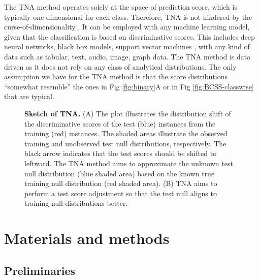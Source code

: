 \documentclass[10pt,letterpaper]{article}
\begin{document}
The TNA method operates solely at the space of prediction score, which is typically one dimensional for each class.
Therefore, TNA is not hindered by the curse-of-dimensionality \cite{donoho2000high}.
It can be employed with any machine learning model, given that the classification is based on discriminative scores.
This includes deep neural networks, black box models, support vector machines \cite{cristianini2000introduction}, with any kind of data such as tabular, text, audio, image, graph data.
The TNA method is data driven as it does not rely on any class of analytical distributions.
The only assumption we have for the TNA method is that the score distributions ``somewhat resemble'' the ones in Fig \ref{fig:binary}A or in Fig \ref{fig:BCSS-classwise} that are typical. 

\begin{figure}
	\centering
	\caption{{\bf Sketch of TNA. } (A) The plot illustrates the distribution shift of the discriminative scores of the test (blue) instances from the training (red) instances.
	The shaded areas illustrate the observed training and unobserved test null distributions, respectively.
	The black arrow indicates that the test scores should be shifted to leftward.
	The TNA method aims to approximate the unknown test null distribution (blue shaded area) based on the known true training null distribution (red shaded area).
	(B) TNA aims to perform a test score adjustment so that the test null aligns to training null distributions better. }
	\label{fig:tna_sketch}
\end{figure}


\section*{Materials and methods}
\subsection*{Preliminaries}
\end{document}
